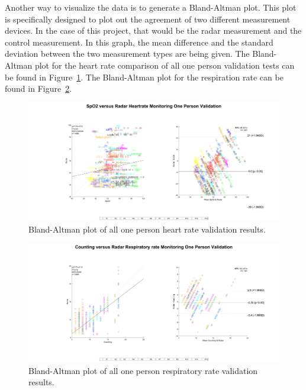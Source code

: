 Another way to visualize the data is to generate a Bland-Altman plot. This plot is specifically designed to plot out the agreement of two different measurement devices. In the case of this project, that would be the radar measurement and the control measurement. In this graph, the mean difference and the standard deviation between the two measurement types are being given. The Bland-Altman plot for the heart rate comparison of all one person validation tests can be found in Figure~\ref{fig:ba_one_heart}. The Bland-Altman plot for the respiration rate can be found in Figure~\ref{fig:ba_one_breath}.

\begin{figure}[t]
    \centering
    \hspace*{-2cm}\includegraphics[width=1.2\textwidth]{figures/validation/bland_altman2.pdf}
    \caption{Bland-Altman plot of all one person heart rate validation results.}
    \label{fig:ba_one_heart}
\end{figure}

\begin{figure}[t]
    \centering
    \hspace*{-2cm}\includegraphics[width=1.2\textwidth]{figures/validation/bland_altman_BR.pdf}
    \caption{Bland-Altman plot of all one person respiratory rate validation results.}
    \label{fig:ba_one_breath}
\end{figure}

